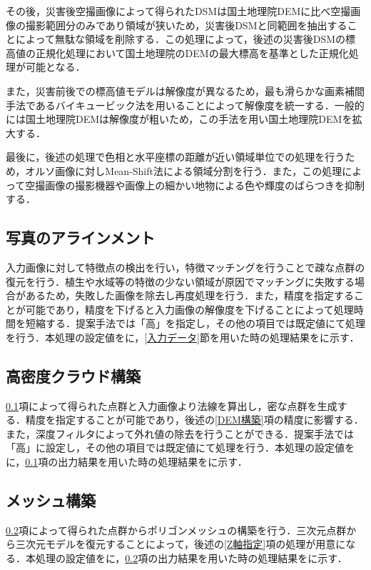     その後，災害後空撮画像によって得られたDSMは国土地理院DEMに比べ空撮画像の撮影範囲分のみであり領域が狭いため，災害後DSMと同範囲を抽出することによって無駄な領域を削除する．この処理によって，後述の災害後DSMの標高値の正規化処理において国土地理院のDEMの最大標高を基準とした正規化処理が可能となる．
  
    また，災害前後での標高値モデルは解像度が異なるため，最も滑らかな画素補間手法であるバイキュービック法\cite{論文手法1}を用いることによって解像度を統一する．一般的には国土地理院DEMは解像度が粗いため，この手法を用い国土地理院DEMを拡大する．

    最後に，後述の処理で色相と水平座標の距離が近い領域単位での処理を行うため，オルソ画像に対しMean-Shift法\cite{論文手法2}による領域分割を行う．また，この処理によって空撮画像の撮影機器や画像上の細かい地物による色や輝度のばらつきを抑制する．


    \subsection{写真のアラインメント}
      \label{写真のアラインメント}
      入力画像に対して特徴点の検出を行い，特徴マッチングを行うことで疎な点群の復元を行う．植生や水域等の特徴の少ない領域が原因でマッチングに失敗する場合があるため，失敗した画像を除去し再度処理を行う．また，精度を指定することが可能であり，精度を下げると入力画像の解像度を下げることによって処理時間を短縮する．提案手法では「高」を指定し，その他の項目では既定値にて処理を行う．本処理の設定値を\fref{}に，\ref{入力データ}節を用いた時の処理結果を\fref{}に示す．

    \subsection{高密度クラウド構築}
      \label{高密度クラウド構築}
      \ref{写真のアラインメント}項によって得られた点群と入力画像より法線を算出し，密な点群を生成する．精度を指定することが可能であり，後述の\ref{DEM構築}項の精度に影響する．また，深度フィルタによって外れ値の除去を行うことができる．提案手法では「高」に設定し，その他の項目では既定値にて処理を行う．本処理の設定値を\fref{}に，\ref{写真のアラインメント}項の出力結果を用いた時の処理結果を\fref{}に示す．

    \subsection{メッシュ構築}
      \label{メッシュ構築}
      \ref{高密度クラウド構築}項によって得られた点群からポリゴンメッシュの構築を行う．三次元点群から三次元モデルを復元することによって，後述の\ref{Z軸指定}項の処理が用意になる．本処理の設定値を\fref{}に，\ref{高密度クラウド構築}項の出力結果を用いた時の処理結果を\fref{}に示す．

